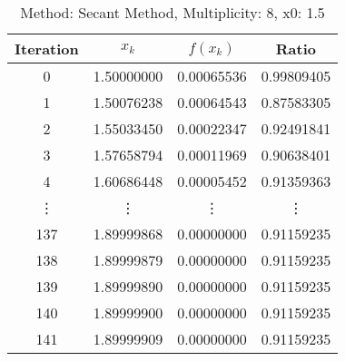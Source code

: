 \begin{table}
\centering
\caption{Method: Secant Method, Multiplicity: 8, x0: 1.5}
\label{tab:table_Secant_Method_8_1_5}
\begin{tabular}{c c c c}
\toprule
Iteration &      $x_k$ &   $f(x_k)$ &      Ratio \\
\midrule
        0 & 1.50000000 & 0.00065536 & 0.99809405 \\
        1 & 1.50076238 & 0.00064543 & 0.87583305 \\
        2 & 1.55033450 & 0.00022347 & 0.92491841 \\
        3 & 1.57658794 & 0.00011969 & 0.90638401 \\
        4 & 1.60686448 & 0.00005452 & 0.91359363 \\
   \vdots &     \vdots &     \vdots &     \vdots \\
      137 & 1.89999868 & 0.00000000 & 0.91159235 \\
      138 & 1.89999879 & 0.00000000 & 0.91159235 \\
      139 & 1.89999890 & 0.00000000 & 0.91159235 \\
      140 & 1.89999900 & 0.00000000 & 0.91159235 \\
      141 & 1.89999909 & 0.00000000 & 0.91159235 \\
\bottomrule
\end{tabular}
\end{table}
